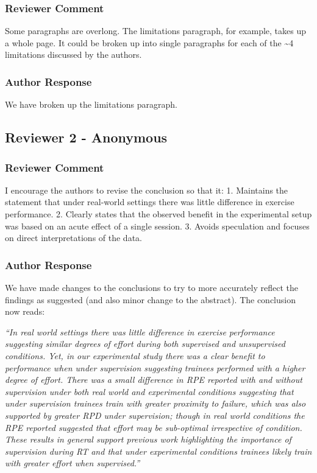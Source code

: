 \documentclass[
  letterpaper,
  DIV=11,
  numbers=noendperiod]{scrartcl}
\begin{document}
\hypertarget{reviewer-comment-15}{%
\subsubsection{Reviewer Comment}\label{reviewer-comment-15}}

Some paragraphs are overlong. The limitations paragraph, for example,
takes up a whole page. It could be broken up into single paragraphs for
each of the \textasciitilde4 limitations discussed by the authors.

\hypertarget{author-response-15}{%
\subsubsection{Author Response}\label{author-response-15}}

We have broken up the limitations paragraph.

\hypertarget{reviewer-2---anonymous}{%
\subsection{Reviewer 2 - Anonymous}\label{reviewer-2---anonymous}}

\hypertarget{reviewer-comment-16}{%
\subsubsection{Reviewer Comment}\label{reviewer-comment-16}}

I encourage the authors to revise the conclusion so that it: 1.
Maintains the statement that under real-world settings there was little
difference in exercise performance. 2. Clearly states that the observed
benefit in the experimental setup was based on an acute effect of a
single session. 3. Avoids speculation and focuses on direct
interpretations of the data.

\hypertarget{author-response-16}{%
\subsubsection{Author Response}\label{author-response-16}}

We have made changes to the conclusions to try to more accurately
reflect the findings as suggested (and also minor change to the
abstract). The conclusion now reads:

\emph{``In real world settings there was little difference in exercise
performance suggesting similar degrees of effort during both supervised
and unsupervised conditions. Yet, in our experimental study there was a
clear benefit to performance when under supervision suggesting trainees
performed with a higher degree of effort. There was a small difference
in RPE reported with and without supervision under both real world and
experimental conditions suggesting that under supervision trainees train
with greater proximity to failure, which was also supported by greater
RPD under supervision; though in real world conditions the RPE reported
suggested that effort may be sub-optimal irrespective of condition.
These results in general support previous work highlighting the
importance of supervision during RT and that under experimental
conditions trainees likely train with greater effort when supervised.''}
\end{document}
